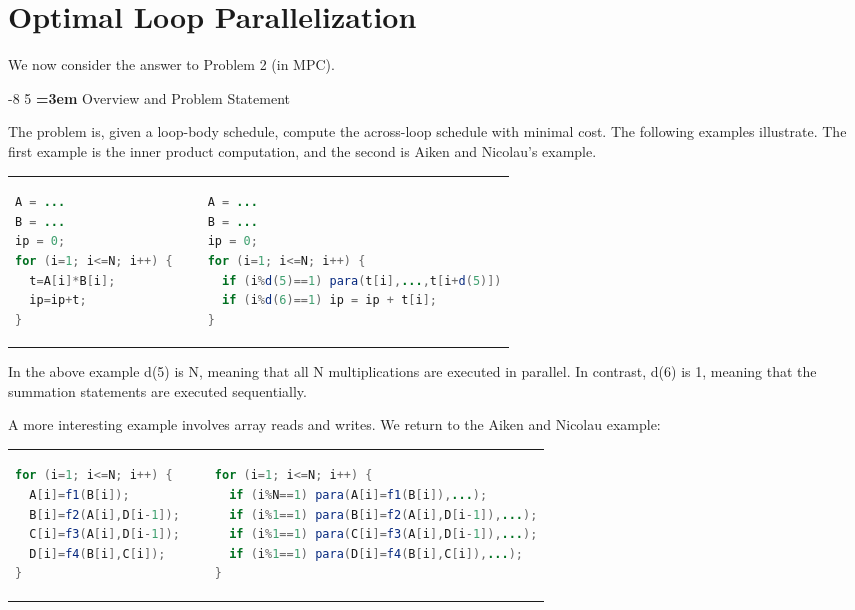 \documentclass[sigconf, screen, natbib=false, dvipsnames, table]{acmart}
\makeatletter
\renewcommand{\subsection}{\@startsection{subsection}{2}{\z@}%
                        {-8\p@ \@plus -4\p@ \@minus -4\p@}%
                        {5\p@ \@plus 2\p@ \@minus 2\p@}%
                        {\normalfont\Large\bfseries\boldmath
                         \rightskip=\z@ \@plus 3em\pretolerance=10000 }}
\theoremstyle{definition}
\makeatother
\begin{document}
\section{Optimal Loop Parallelization} 
\label{sec:optimal_loop_parallelization}
%


We now consider the answer to Problem 2 (in MPC). 

\subsection{Overview and Problem Statement} 

The problem is, given a loop-body schedule, compute the across-loop schedule
with minimal cost. The following examples illustrate. The first example is the inner 
product computation, and the second is Aiken and Nicolau's example.

\begin{tabular}{lll}
\begin{lstlisting}[language=Java]
A = ...
B = ...
ip = 0;
for (i=1; i<=N; i++) {
  t=A[i]*B[i];
  ip=ip+t;
}	

\end{lstlisting}
& 
~
&
\begin{lstlisting}[language=Java]
A = ...
B = ...
ip = 0;
for (i=1; i<=N; i++) {
  if (i%d(5)==1) para(t[i],...,t[i+d(5)])
  if (i%d(6)==1) ip = ip + t[i];
}  
\end{lstlisting}

\end{tabular}


In the above example {\sf d(5)} is N, meaning that all N multiplications are executed in parallel.
In contrast, {\sf d(6)} is 1, meaning that the summation statements are executed sequentially.

A more interesting example involves array reads and writes. We return to the Aiken and Nicolau
example:

\begin{tabular}{lll}
\begin{lstlisting}[language=Java]
for (i=1; i<=N; i++) {
  A[i]=f1(B[i]);
  B[i]=f2(A[i],D[i-1]);
  C[i]=f3(A[i],D[i-1]);
  D[i]=f4(B[i],C[i]);
}	

\end{lstlisting}
& 
~
&
\begin{lstlisting}[language=Java]
for (i=1; i<=N; i++) {
  if (i%N==1) para(A[i]=f1(B[i]),...);
  if (i%1==1) para(B[i]=f2(A[i],D[i-1]),...);
  if (i%1==1) para(C[i]=f3(A[i],D[i-1]),...);
  if (i%1==1) para(D[i]=f4(B[i],C[i]),...);
}	
\end{lstlisting}

\end{tabular}
\end{document}
